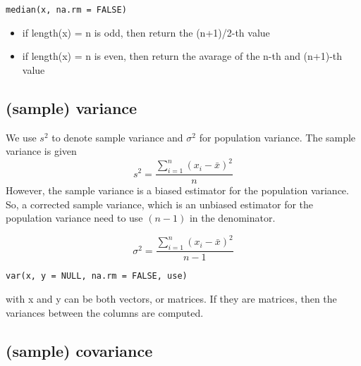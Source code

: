 \begin{verbatim}
median(x, na.rm = FALSE)
\end{verbatim}
\begin{itemize}
\item if length(x) = n is odd, then return the (n+1)/2-th value
\item if length(x) = n is even, then return the avarage of the n-th
  and (n+1)-th value
\end{itemize}

\subsection{(sample) variance}
\label{sec:sample-variance}

We use $s^2$ to denote sample variance and $\sigma^2$ for population
variance. The sample variance is given
\begin{equation}
  \label{eq:9}
  s^2 = \frac{\sum_{i=1}^n (x_i-\bar{x})^2}{n}
\end{equation}
However, the sample variance is a biased estimator for the population
variance. So, a corrected sample variance, which is an unbiased
estimator for the population variance need to use $(n-1)$ in the
denominator.

\begin{equation}
  \label{eq:10}
  \sigma^2 = \frac{\sum_{i=1}^n (x_i-\bar{x})^2}{n-1}
\end{equation}

\begin{verbatim}
var(x, y = NULL, na.rm = FALSE, use)
\end{verbatim}
with x and y can be both vectors, or matrices. If they are matrices,
then the variances between the columns are computed.



\subsection{(sample) covariance}
\label{sec:sample-covariance}


